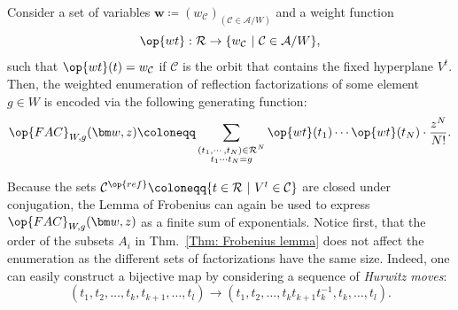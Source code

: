 \begin{defi}\label{Defn: weight function}
Consider a set of variables $\bm w\coloneqq (w_{\mathcal{C}})_{(\mathcal{C}\in\mathcal{A}/W)}$ and a weight function $$\op{wt}:\mathcal{R}\rightarrow\{ w_{\mathcal{C}}\ |\ \mathcal{C}\in\mathcal{A}/W\},$$ such that $\op{wt}(t)=w_{\mathcal{C}}$ if $\mathcal{C}$ is the orbit that contains the fixed hyperplane $V^t$. Then, the weighted enumeration of reflection factorizations of some element $g\in W$ is encoded via the following generating function:
$$\op{FAC}_{W,g}(\bm w,z)\coloneqq \sum_{\substack{(t_1,\cdots,t_N)\in\mathcal{R}^N\\t_1\cdots t_N=g}}\op{wt}(t_1)\cdots\op{wt}(t_N)\cdot \dfrac{z^N}{N!}. $$
\end{defi}

Because the sets $\mathcal{C}^{\op{ref}}\coloneqq \{t\in\mathcal{R}\ |\ V^t\in\mathcal{C}\}$ are closed under conjugation, the Lemma of Frobenius can again be used to express $\op{FAC}_{W,g}(\bm w,z)$ as a finite sum of exponentials. Notice first, that the order of the subsets $A_i$ in Thm.~\ref{Thm: Frobenius lemma} does not affect the enumeration as the different sets of factorizations have the same size. Indeed, one can easily construct a bijective map by considering a sequence of {\it Hurwitz moves}:$$
(t_1,t_2,\ldots,t_k,t_{k+1},\ldots ,t_l)\rightarrow (t_1,t_2,\ldots,t_kt_{k+1}t_k^{-1},t_k,\ldots,t_l).$$  

